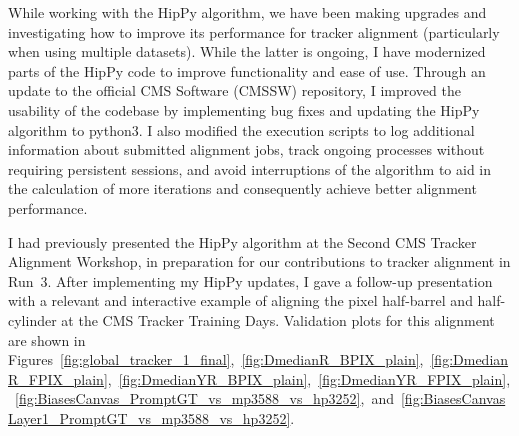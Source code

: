 While working with the HipPy algorithm, we have been making upgrades and investigating how to improve its performance for tracker alignment (particularly when using multiple datasets). While the latter is ongoing, I have modernized parts of the HipPy code to improve functionality and ease of use. Through an update to the official CMS Software (CMSSW) repository, I improved the usability of the codebase by implementing bug fixes and updating the HipPy algorithm to python3. I also modified the execution scripts to log additional information about submitted alignment jobs, track ongoing processes without requiring persistent sessions, and avoid interruptions of the algorithm to aid in the calculation of more iterations and consequently achieve better alignment performance. 

I had previously presented the HipPy algorithm at the Second CMS Tracker Alignment Workshop, in preparation for our contributions to tracker alignment in Run~3. After implementing my HipPy updates, I gave a follow-up presentation with a relevant and interactive example of aligning the pixel half-barrel and half-cylinder at the CMS Tracker Training Days. Validation plots for this alignment are shown in Figures~\ref{fig:global_tracker_1_final},~\ref{fig:DmedianR_BPIX_plain},~\ref{fig:DmedianR_FPIX_plain},~\ref{fig:DmedianYR_BPIX_plain},~\ref{fig:DmedianYR_FPIX_plain},~\ref{fig:BiasesCanvas_PromptGT_vs_mp3588_vs_hp3252},~and~\ref{fig:BiasesCanvasLayer1_PromptGT_vs_mp3588_vs_hp3252}.


